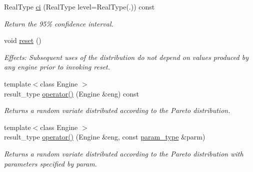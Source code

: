 \begin{DoxyCompactItemize}
Real\+Type \mbox{\hyperlink{classpareto__distribution_a0ab5bbfc1834d4184db153a5803922eb}{ci}} (Real\+Type level=Real\+Type(.)) const
\begin{DoxyCompactList}\small\item\em Return the 95\% confidence interval. \end{DoxyCompactList}\item 
\mbox{\label{classpareto__distribution_afaf787428998d91ac739d2a5356f3e20}} 
void \mbox{\hyperlink{classpareto__distribution_afaf787428998d91ac739d2a5356f3e20}{reset}} ()
\begin{DoxyCompactList}\small\item\em Effects\+: Subsequent uses of the distribution do not depend on values produced by any engine prior to invoking reset. \end{DoxyCompactList}\item 
\mbox{\label{classpareto__distribution_ad711d059b455b643767fb9e907595d67}} 
{\footnotesize template$<$class Engine $>$ }\\result\+\_\+type \mbox{\hyperlink{classpareto__distribution_ad711d059b455b643767fb9e907595d67}{operator()}} (Engine \&eng) const
\begin{DoxyCompactList}\small\item\em Returns a random variate distributed according to the Pareto distribution. \end{DoxyCompactList}\item 
\mbox{\label{classpareto__distribution_a627683402f68bba682621994612d9f28}} 
{\footnotesize template$<$class Engine $>$ }\\result\+\_\+type \mbox{\hyperlink{classpareto__distribution_a627683402f68bba682621994612d9f28}{operator()}} (Engine \&eng, const \mbox{\hyperlink{classpareto__distribution_1_1param__type}{param\+\_\+type}} \&parm)
\begin{DoxyCompactList}\small\item\em Returns a random variate distributed according to the Pareto distribution with parameters specified by param. \end{DoxyCompactList}\end{DoxyCompactItemize}
